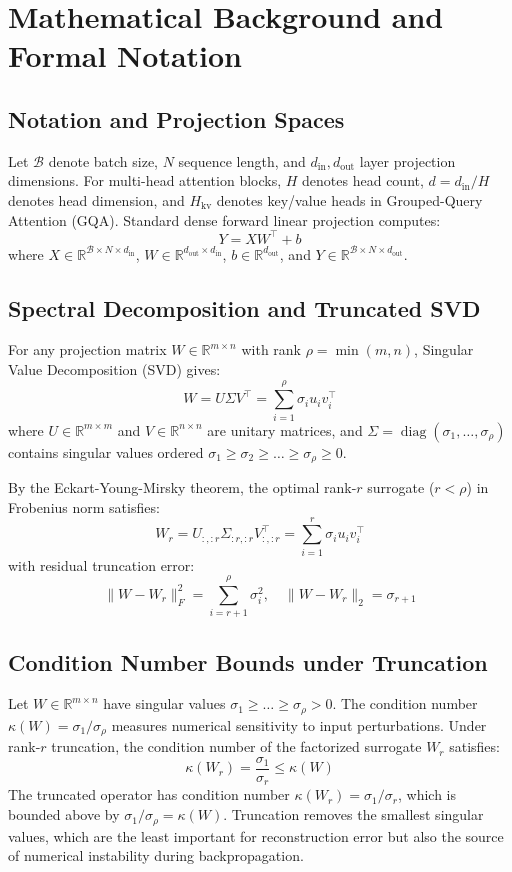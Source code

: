 \section{Mathematical Background and Formal Notation}

\subsection{Notation and Projection Spaces}
Let $\mathcal{B}$ denote batch size, $N$ sequence length, and $d_{\text{in}}, d_{\text{out}}$ layer projection dimensions. For multi-head attention blocks, $H$ denotes head count, $d = d_{\text{in}} / H$ denotes head dimension, and $H_{\text{kv}}$ denotes key/value heads in Grouped-Query Attention (GQA).
Standard dense forward linear projection computes:
\[
Y = X W^\top + b
\]
where $X \in \mathbb{R}^{\mathcal{B} \times N \times d_{\text{in}}}$, $W \in \mathbb{R}^{d_{\text{out}} \times d_{\text{in}}}$, $b \in \mathbb{R}^{d_{\text{out}}}$, and $Y \in \mathbb{R}^{\mathcal{B} \times N \times d_{\text{out}}}$.

\subsection{Spectral Decomposition and Truncated SVD}
For any projection matrix $W \in \mathbb{R}^{m \times n}$ with rank $\rho = \min(m, n)$, Singular Value Decomposition (SVD) gives:
\[
W = U \Sigma V^\top = \sum_{i=1}^{\rho} \sigma_i u_i v_i^\top
\]
where $U \in \mathbb{R}^{m \times m}$ and $V \in \mathbb{R}^{n \times n}$ are unitary matrices, and $\Sigma = \operatorname{diag}(\sigma_1, \dots, \sigma_\rho)$ contains singular values ordered $\sigma_1 \ge \sigma_2 \ge \dots \ge \sigma_\rho \ge 0$.

By the Eckart-Young-Mirsky theorem, the optimal rank-$r$ surrogate ($r < \rho$) in Frobenius norm satisfies:
\[
W_r = U_{:, :r} \Sigma_{:r, :r} V_{:, :r}^\top = \sum_{i=1}^{r} \sigma_i u_i v_i^\top
\]
with residual truncation error:
\[
\|W - W_r\|_F^2 = \sum_{i=r+1}^{\rho} \sigma_i^2, \quad \|W - W_r\|_2 = \sigma_{r+1}
\]

\subsection{Condition Number Bounds under Truncation}
Let $W \in \mathbb{R}^{m \times n}$ have singular values $\sigma_1 \ge \dots \ge \sigma_\rho > 0$. The condition number $\kappa(W) = \sigma_1 / \sigma_\rho$ measures numerical sensitivity to input perturbations. Under rank-$r$ truncation, the condition number of the factorized surrogate $W_r$ satisfies:
\[
\kappa(W_r) = \frac{\sigma_1}{\sigma_r} \le \kappa(W)
\]
The truncated operator has condition number $\kappa(W_r) = \sigma_1/\sigma_r$, which is bounded above by $\sigma_1/\sigma_\rho = \kappa(W)$. Truncation removes the smallest singular values, which are the least important for reconstruction error but also the source of numerical instability during backpropagation.

